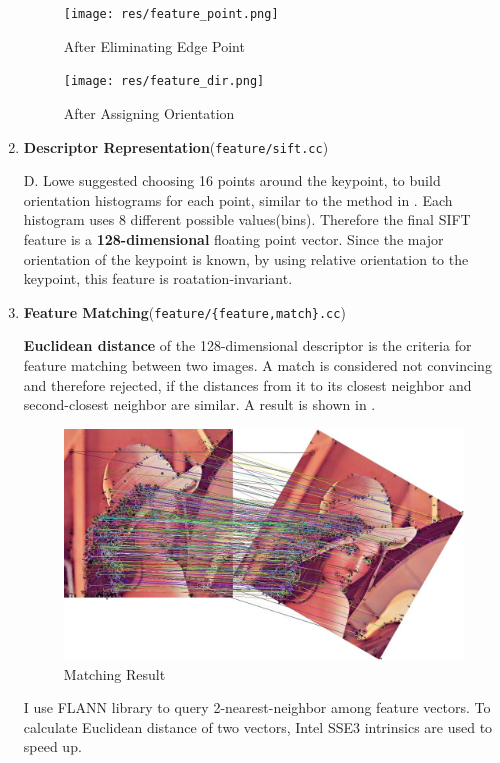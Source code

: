 \begin{enumerate}
    \begin{figure}
      \begin{minipage}[b]{0.46\linewidth}
        \centering
        \texttt{[image: res/feature\_point.png]}
        \caption{After Eliminating Edge Point\label{fig:feature3}}
      \end{minipage}
      \hspace{1em}
      \begin{minipage}[b]{0.46\linewidth}
        \centering
        \texttt{[image: res/feature\_dir.png]}
        \caption{After Assigning Orientation\label{fig:feature4}}
      \end{minipage}
    \end{figure}

  \item \textbf{Descriptor Representation}(\verb|feature/sift.cc|)

    D. Lowe suggested choosing 16 points around the keypoint, to build orientation histograms for each point, similar
    to the method in .
    Each histogram uses 8 different possible values(bins). Therefore the final SIFT feature is a \textbf{128-dimensional}
    floating point vector.
    Since the major orientation of the keypoint is known, by using relative orientation to the keypoint,
    this feature is roatation-invariant.

  \item \textbf{Feature Matching}(\verb|feature/{feature,match}.cc|)

    \textbf{Euclidean distance} of the 128-dimensional descriptor is the criteria for feature matching between two images.
    A match is considered not convincing and therefore rejected,
    if the distances from it to its closest neighbor and second-closest neighbor are similar.
    A result is shown in .
    \begin{figure}[H]
      \centering
      \includegraphics[width=\textwidth]{res/match.jpg}
      \caption{Matching Result\label{fig:match}}
    \end{figure}

    I use FLANN library \cite{flann} to query 2-nearest-neighbor among feature vectors.
    To calculate Euclidean distance of two vectors, Intel SSE3 intrinsics are used to speed up.

\end{enumerate}

